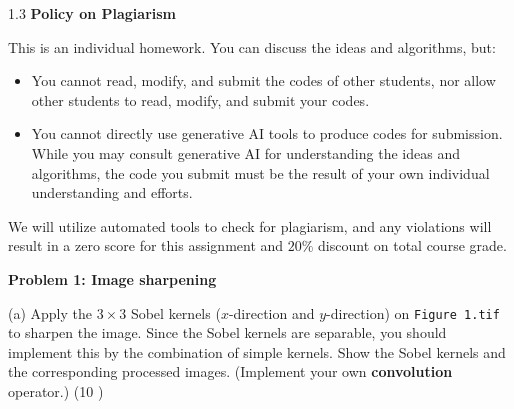 \documentclass[A4paper, 11pt]{article}
\newcommand{\<}{\,\langle\,}
\renewcommand{\>}{\,\rangle}
\newcommand{\Pro}[1]{\textbf{\large{Problem #1}} \vspace*{1ex}}
\newcommand{\Pt}[1]{\textcolor{emph}{(#1 \ifthenelse{\equal{#1}{1}}{point}{points})}}
\newcommand{\0}{\mathbf{0}}
\newcommand{\1}{\mathbf{1}}
\begin{document}
\begin{spacing}{1.3}
\vspace*{2ex}
\textbf{\large{Policy on Plagiarism}}
\vspace*{1.5ex}

This is an individual homework. You can discuss the ideas and algorithms, but:
\begin{itemize} \setlength{\parskip}{0.5ex} \vspace*{-1.5ex}
    \item You cannot read, modify, and submit the codes of other students, nor allow other students to read, modify, and submit your codes.
    \item You cannot directly use generative AI tools to produce codes for submission. While you may consult generative AI for understanding the ideas and algorithms, the code you submit must be the result of your own individual understanding and efforts.
\end{itemize} \vspace*{-1.5ex}
We will utilize automated tools to check for plagiarism, and any violations will result in a zero score for this assignment and $20\%$ discount on total course grade.

\newpage

%
%
%
%
%
%

\Pro{1: Image sharpening}

(a) Apply the $3\times 3$ Sobel kernels ($x$-direction and $y$-direction) on \texttt{Figure 1.tif} to sharpen the image. Since the Sobel kernels are separable, you should implement this by the combination of simple kernels. Show the Sobel kernels and the corresponding processed images. (Implement your own \textbf{convolution} operator.) \Pt{10}


\end{spacing}
\end{document}
